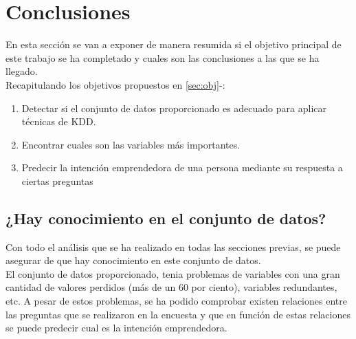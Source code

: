 \chapter{Conclusiones}
\label{sec:conclusiones}
En esta sección se van a exponer de manera resumida si el objetivo principal de este trabajo se ha completado y cuales son las conclusiones a las que se ha llegado.\\
\linebreak
Recapitulando los objetivos propuestos en \ref{sec:obj}-:
\begin{enumerate}[1.]
	\item Detectar si el conjunto de datos proporcionado es adecuado para aplicar técnicas de KDD.
	\item Encontrar cuales son las variables más importantes.
	\item Predecir la intención emprendedora de una persona mediante su respuesta a ciertas preguntas
\end{enumerate}
\section{¿Hay conocimiento en el conjunto de datos?}
Con todo el análisis que se ha realizado en todas las secciones previas, se puede asegurar de que hay conocimiento en este conjunto de datos.\\
El conjunto de datos proporcionado, tenia problemas de variables con una gran cantidad de valores perdidos (más de un 60 por ciento), variables redundantes, etc. A pesar de estos problemas, se ha podido comprobar existen relaciones entre las preguntas que se realizaron en la encuesta y que en función de estas relaciones se puede predecir cual es la intención emprendedora.
